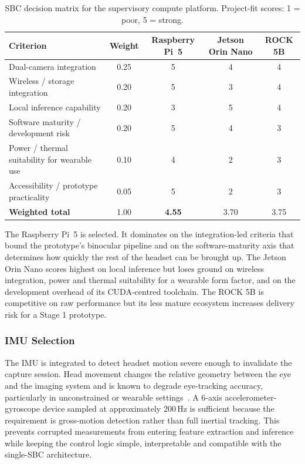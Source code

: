 \begin{table}[htbp]
    \centering
    \caption{SBC decision matrix for the supervisory compute platform. Project-fit scores: 1 = poor, 5 = strong.}
    \label{tab:sbc-comparison}
    \begin{tabular}{lcccc}
        \toprule
        \textbf{Criterion} & \textbf{Weight} & \textbf{Raspberry Pi~5} & \textbf{Jetson Orin Nano} & \textbf{ROCK 5B} \\
        \midrule
        Dual-camera integration                       & 0.25 & 5 & 4 & 4 \\
        Wireless / storage integration                & 0.20 & 5 & 3 & 4 \\
        Local inference capability                    & 0.20 & 3 & 5 & 4 \\
        Software maturity / development risk          & 0.20 & 5 & 4 & 3 \\
        Power / thermal suitability for wearable use  & 0.10 & 4 & 2 & 3 \\
        Accessibility / prototype practicality        & 0.05 & 5 & 2 & 3 \\
        \midrule
        \textbf{Weighted total}                       & 1.00 & \textbf{4.55} & 3.70 & 3.75 \\
        \bottomrule
    \end{tabular}
\end{table}

The Raspberry Pi~5 is selected. It dominates on the integration-led criteria that bound the prototype's binocular pipeline and on the software-maturity axis that determines how quickly the rest of the headset can be brought up. The Jetson Orin Nano scores highest on local inference but loses ground on wireless integration, power and thermal suitability for a wearable form factor, and on the development overhead of its CUDA-centred toolchain. The ROCK 5B is competitive on raw performance but its less mature ecosystem increases delivery risk for a Stage 1 prototype.

\subsubsection{IMU Selection}

The IMU is integrated to detect headset motion severe enough to invalidate the capture session. Head movement changes the relative geometry between the eye and the imaging system and is known to degrade eye-tracking accuracy, particularly in unconstrained or wearable settings~\cite{farivar2016eyetracker}. A 6-axis accelerometer-gyroscope device sampled at approximately 200\,Hz is sufficient because the requirement is gross-motion detection rather than full inertial tracking. This prevents corrupted measurements from entering feature extraction and inference while keeping the control logic simple, interpretable and compatible with the single-SBC architecture.


